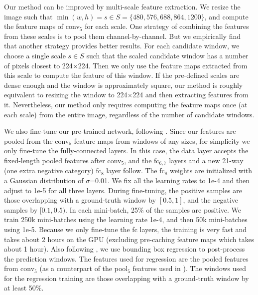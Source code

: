 \documentclass[10pt,journal,cspaper,compsoc]{IEEEtran}
\begin{document}
Our method can be improved by multi-scale feature extraction. We resize the image such that $\min(w,h)=s\in S = \{480, 576, 688, 864, 1200\}$, and compute the feature maps of conv$_5$ for each scale. One strategy of combining the features from these scales is to pool them channel-by-channel. But we empirically find that another strategy provides better results. For each candidate window, we choose a single scale $s\in S$ such that the scaled candidate window has a number of pixels closest to 224$\times$224. Then we only use the feature maps extracted from this scale to compute the feature of this window. If the pre-defined scales are dense enough and the window is approximately square, our method is roughly equivalent to resizing the window to 224$\times$224 and then extracting features from it. Nevertheless, our method only requires computing the feature maps once (at each scale) from the entire image, regardless of the number of candidate windows.

We also fine-tune our pre-trained network, following \cite{Girshick2014}. Since our features are pooled from the conv$_5$ feature maps from windows of any sizes, for simplicity we only fine-tune the fully-connected layers. In this case, the data layer accepts the fixed-length pooled features after conv$_5$, and the fc$_{6,7}$ layers and a new 21-way (one extra negative category) fc$_8$ layer follow. The fc$_8$ weights are initialized with a Gaussian distribution of $\sigma$=0.01. We fix all the learning rates to 1e-4 and then adjust to 1e-5 for all three layers. During fine-tuning, the positive samples are those overlapping with a ground-truth window by $[0.5, 1]$, and the negative samples by $[0.1, 0.5)$. In each mini-batch, 25\% of the samples are positive. We train 250k mini-batches using the learning rate 1e-4, and then 50k mini-batches using 1e-5. Because we only fine-tune the fc layers, the training is very fast and takes about 2 hours on the GPU (excluding pre-caching feature maps which takes about 1 hour).
Also following \cite{Girshick2014}, we use bounding box regression to post-process the prediction windows. The features used for regression are the pooled features from conv$_5$ (as a counterpart of the pool$_5$ features used in \cite{Girshick2014}). The windows used for the regression training are those overlapping with a ground-truth window by at least 50\%.
\end{document}
